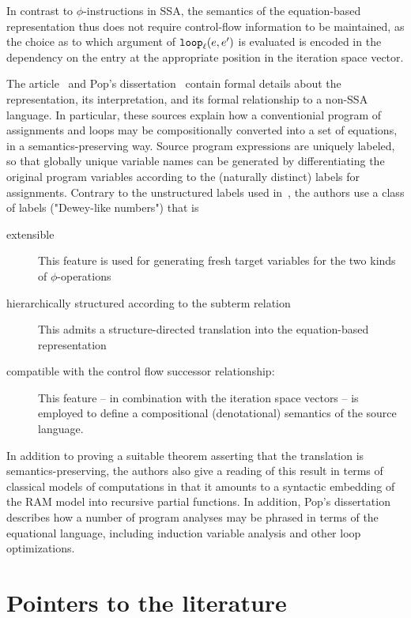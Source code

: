 In contrast to $\phi$-instructions in SSA, the semantics of the
equation-based representation thus does not require control-flow
information to be maintained, as the choice as to which argument of
$\mathtt{loop}_{{\ell}}({e},{e'})$ is evaluated is encoded in the dependency on
the entry at the appropriate position in the iteration space vector.

The article~\cite{PopCJS2006} and Pop's
dissertation~\cite{PopDissertation} contain formal details about the
representation, its interpretation, and its formal relationship to a
non-SSA language. In particular, these sources explain how a
conventionial program of assignments and loops may be compositionally
converted into a set of equations, in a semantics-preserving
way. Source program expressions are uniquely labeled, so that globally
unique variable names can be generated by differentiating the original
program variables according to the (naturally distinct) labels for
assignments.  Contrary to the unstructured labels used
in~\cite{NielsonNielsonHanking:POPA}, the authors use a class of
labels ("Dewey-like numbers") that is 
\begin{description}
\item[extensible] This feature
is used for generating fresh target variables for the two kinds
of $\phi$-operations
\item[hierarchically structured according to the subterm relation]
   This admits  a structure-directed translation into
the equation-based representation
\item [compatible with the control flow successor relationship:] 
  This feature -- in combination
with the iteration space vectors -- is employed to define a compositional
(denotational) semantics of the source language. 
\end{description}
In addition to proving a suitable theorem asserting that the
translation is semantics-preserving, the authors also give a reading
of this result in terms of classical models of computations in that it
amounts to a syntactic embedding of the RAM model into recursive
partial functions.  In addition, Pop's
dissertation~\cite{PopDissertation} describes how a number of program
analyses may be phrased in terms of the equational language, including
induction variable analysis and other loop optimizations.


\section{Pointers to the literature}
\label{section:Part1:Semantics:Discussion}

